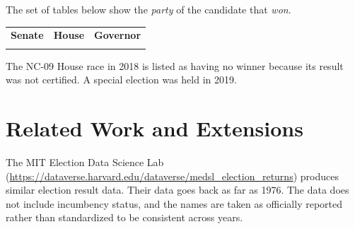 \documentclass[12pt]{article}
\begin{document}
The set of tables below show the \emph{party} of the candidate that \emph{won}.

    \begin{tabularx}{\linewidth}{CCC}
    \textbf{Senate} & \textbf{House} & \textbf{Governor}\\
     &  & 
    \end{tabularx}

The NC-09 House race in 2018 is listed as having no winner because its result was not certified. A special election was held in 2019.





\section{Related Work and Extensions}

The MIT Election Data Science Lab (\url{https://dataverse.harvard.edu/dataverse/medsl\_election\_returns}) produces similar election result data. Their data goes back as far as 1976. The data does not include incumbency status, and the names are taken as officially reported rather than standardized to be consistent across years.
\end{document}
